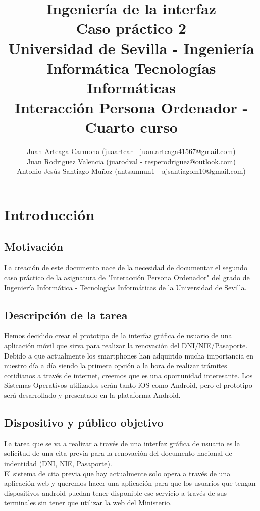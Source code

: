 \documentclass[a4paper,11pt]{article}
\title{
        \textbf{Ingeniería de la interfaz}\large\\
        \textbf{Caso práctico 2}\\
        \medskip
        Universidad de Sevilla - Ingeniería Informática Tecnologías Informáticas\\
        Interacción Persona Ordenador - Cuarto curso}
\author{Juan Arteaga Carmona (juaartcar - juan.arteaga41567@gmail.com)\\
        Juan Rodriguez Valencia (juarodval - resperodriguez@outlook.com)\\
        Antonio Jesús Santiago Muñoz (antsanmun1 - ajsantiagom10@gmail.com)\\
}
\begin{document}
\maketitle

\newpage
\tableofcontents
\listoffigures
\newpage



\section{Introducción}
\subsection{Motivación}
La creación de este documento nace de la necesidad de documentar el segundo caso práctico de la asignatura de "Interacción Persona Ordenador" del grado de Ingeniería Informática - Tecnologías Informáticas de la Universidad de Sevilla.

\subsection{Descripción de la tarea}
Hemos decidido crear el prototipo de la interfaz gráfica de usuario de una aplicación móvil que sirva para realizar la renovación del DNI/NIE/Pasaporte. Debido a que actualmente los smartphones han adquirido mucha importancia en nuestro día a día siendo la primera opción a la hora de realizar trámites cotidianos a través de internet, creemos que es una oportunidad interesante. Los Sistemas Operativos utilizados serán tanto iOS como Android, pero el prototipo será desarrollado y presentado en la plataforma Android.\\

\subsection{Dispositivo y público objetivo}
La tarea que se va a realizar a través de una interfaz gráfica de usuario es la solicitud de una cita previa para la renovación del documento nacional de indentidad (DNI, NIE, Pasaporte).\\
El sistema de cita previa que hay actualmente solo opera a través de una aplicación web\cite{webcitaDNI} y queremos hacer una aplicación para que los usuarios que tengan dispositivos android puedan tener disponible ese servicio a través de sus terminales sin tener que utilizar la web del Ministerio.\\
\end{document}
